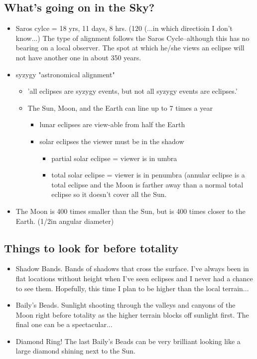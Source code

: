 \documentclass{article}
\begin{document}
\subsection{What's going on in the Sky?}
\begin{itemize}
\item Saros cylce = 18 yrs, 11 days, 8 hrs.  (120 \degree (...in which directioin I don't know...)  The type of alignment follows the Saros Cycle--although this has no bearing on a local observer.  The spot at which he/she views an eclipse will not have another one in about 350 years.
\item syzygy  "astronomical alignment"
	\begin{itemize}
\item 'all eclipses are syzygy events, but not all syzygy events are eclipses.'
\item The Sun, Moon, and the Earth can line up to 7 times a year
		\begin{itemize}
		\item lunar eclipses are view-able from half the Earth
		\item solar eclipses the viewer must be in the shadow
			\begin{itemize}
			\item partial solar eclipse = viewer is in umbra
			\item total solar eclipse = viewer is in penumbra
			(annular eclipse is a total eclipse and the Moon is farther away than a normal total eclipse so it doesn't cover all the Sun.
			\end{itemize}
		\end{itemize}
	\end{itemize}
\item The Moon is 400 times smaller than the Sun, but is 400 times closer to the Earth. (1/2\degree in angular diameter)
\end{itemize}

\subsection{Things to look for before totality}
\begin{itemize}
\item Shadow Bands.  Bands of shadows that cross the surface.  I've always been in flat locations without height when I've seen eclipses and I never had a chance to see them.  Hopefully, this time I plan to be higher than the local terrain...
\item Baily's Beads.  Sunlight shooting through the valleys and canyons of the Moon right before totality as the higher terrain blocks off sunlight first.  The final one can be a spectacular...
\item Diamond Ring!  The last Baily's Beads can be very brilliant looking like a large diamond shining next to the Sun. 
\end{itemize}
\end{document}
